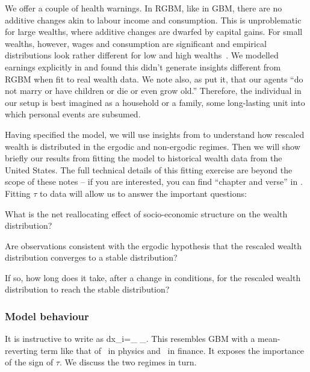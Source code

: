 We offer a couple of health warnings. In RGBM, like in GBM, there are no additive changes akin to labour income and consumption. This is unproblematic for large wealths, where additive changes are dwarfed by capital gains. For small wealths, however, wages and consumption are significant and empirical distributions look rather different for low and high wealths~\cite{DragulescuYakovenko2001}. We modelled earnings explicitly in \cite{BermanPetersAdamou2017} and found this didn't generate insights different from RGBM when fit to real wealth data. We note also, as \cite[p.~41]{meade1964efficiency} put it, that our agents ``do not marry or have children or die or even grow old.'' Therefore, the individual in our setup is best imagined as a household or a family, \ie some long-lasting unit into which personal events are subsumed.

Having specified the model, we will use insights from  to understand how rescaled wealth is distributed in the ergodic and non-ergodic regimes. Then we will show briefly our results from fitting the model to historical wealth data from the United States. The full technical details of this fitting exercise are beyond the scope of these notes -- if you are interested, you can find ``chapter and verse'' in \cite{BermanPetersAdamou2017}. Fitting $\tau$ to data will allow us to answer the important questions:
\bi
\item
What is the net reallocating effect of socio-economic structure on the wealth distribution?
\item
Are observations consistent with the ergodic hypothesis that the rescaled wealth distribution converges to a stable distribution?
\item
If so, how long does it take, after a change in conditions, for the rescaled wealth distribution to reach the stable distribution?
\ei


\subsubsection{Model behaviour}
It is instructive to write  as
\be
dx_i=_{} \;\; _{}.
\ee
This resembles GBM with a mean-reverting term like that of~\cite{UhlenbeckOrnstein1930} in physics and~\cite{Vasicek1977} in finance. It exposes the importance of the sign of $\tau$. We discuss the two regimes in turn.

